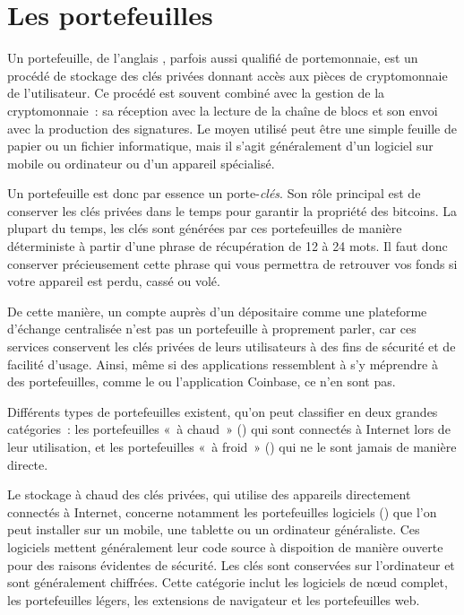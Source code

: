 \section*{Les portefeuilles}


Un portefeuille, de l'anglais , parfois aussi qualifié de portemonnaie, est un procédé de stockage des clés privées donnant accès aux pièces de cryptomonnaie de l'utilisateur. Ce procédé est souvent combiné avec la gestion de la cryptomonnaie~: sa réception avec la lecture de la chaîne de blocs et son envoi avec la production des signatures. Le moyen utilisé peut être une simple feuille de papier ou un fichier informatique, mais il s'agit généralement d'un logiciel sur mobile ou ordinateur ou d'un appareil spécialisé.

Un portefeuille est donc par essence un porte-\emph{clés}. Son rôle principal est de conserver les clés privées dans le temps pour garantir la propriété des bitcoins. La plupart du temps, les clés sont générées par ces portefeuilles de manière déterministe à partir d'une phrase de récupération de 12 à 24 mots. Il faut donc conserver précieusement cette phrase qui vous permettra de retrouver vos fonds si votre appareil est perdu, cassé ou volé.

De cette manière, un compte auprès d'un dépositaire comme une plateforme d'échange centralisée n'est pas un portefeuille à proprement parler, car ces services conservent les clés privées de leurs utilisateurs à des fins de sécurité et de facilité d'usage. Ainsi, même si des applications ressemblent à s'y méprendre à des portefeuilles, comme le  ou l'application Coinbase, ce n'en sont pas. 

Différents types de portefeuilles existent, qu'on peut classifier en deux grandes catégories~: les portefeuilles «~à chaud~» () qui sont connectés à Internet lors de leur utilisation, et les portefeuilles «~à froid~» () qui ne le sont jamais de manière directe.


Le stockage à chaud des clés privées, qui utilise des appareils directement connectés à Internet, concerne notamment les portefeuilles logiciels () que l'on peut installer sur un mobile, une tablette ou un ordinateur généraliste. Ces logiciels mettent généralement leur code source à dispoition de manière ouverte pour des raisons évidentes de sécurité. Les clés sont conservées sur l'ordinateur et sont généralement chiffrées. Cette catégorie inclut les logiciels de nœud complet, les portefeuilles légers, les extensions de navigateur et les portefeuilles web.

